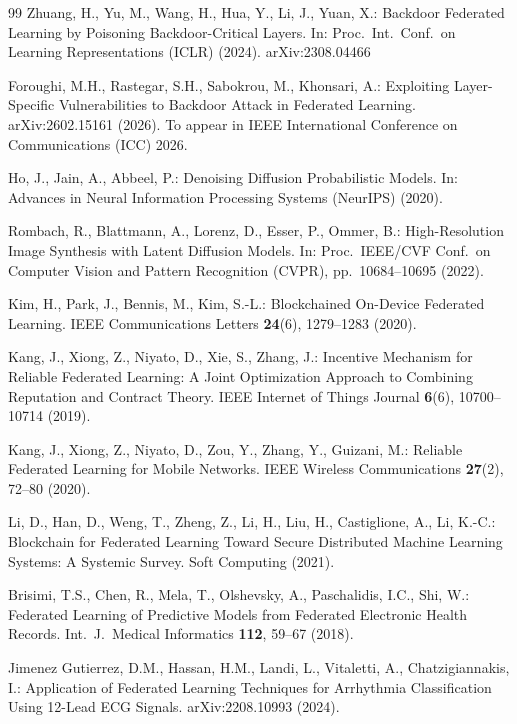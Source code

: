 \documentclass[runningheads]{llncs}
\begin{document}
\begin{thebibliography}{99}
Zhuang, H., Yu, M., Wang, H., Hua, Y., Li, J., Yuan, X.:
Backdoor Federated Learning by Poisoning Backdoor-Critical
Layers. In: Proc.\ Int.\ Conf.\ on Learning Representations
(ICLR) (2024). arXiv:2308.04466

Foroughi, M.H., Rastegar, S.H., Sabokrou, M., Khonsari, A.:
Exploiting Layer-Specific Vulnerabilities to Backdoor Attack in
Federated Learning. arXiv:2602.15161 (2026). To appear in
IEEE International Conference on Communications (ICC) 2026.

Ho, J., Jain, A., Abbeel, P.: Denoising Diffusion Probabilistic
Models. In: Advances in Neural Information Processing Systems
(NeurIPS) (2020).

Rombach, R., Blattmann, A., Lorenz, D., Esser, P., Ommer, B.:
High-Resolution Image Synthesis with Latent Diffusion Models.
In: Proc.\ IEEE/CVF Conf.\ on Computer Vision and Pattern
Recognition (CVPR), pp.~10684--10695 (2022).

Kim, H., Park, J., Bennis, M., Kim, S.-L.: Blockchained
On-Device Federated Learning. IEEE Communications Letters
\textbf{24}(6), 1279--1283 (2020). 

Kang, J., Xiong, Z., Niyato, D., Xie, S., Zhang, J.: Incentive
Mechanism for Reliable Federated Learning: A Joint Optimization
Approach to Combining Reputation and Contract Theory. IEEE
Internet of Things Journal \textbf{6}(6), 10700--10714 (2019).

Kang, J., Xiong, Z., Niyato, D., Zou, Y., Zhang, Y., Guizani, M.:
Reliable Federated Learning for Mobile Networks. IEEE Wireless
Communications \textbf{27}(2), 72--80 (2020).

Li, D., Han, D., Weng, T., Zheng, Z., Li, H., Liu, H., Castiglione,
A., Li, K.-C.: Blockchain for Federated Learning Toward Secure
Distributed Machine Learning Systems: A Systemic Survey. Soft
Computing (2021). 

Brisimi, T.S., Chen, R., Mela, T., Olshevsky, A., Paschalidis,
I.C., Shi, W.: Federated Learning of Predictive Models from
Federated Electronic Health Records. Int.\ J.\ Medical
Informatics \textbf{112}, 59--67 (2018).

Jimenez Gutierrez, D.M., Hassan, H.M., Landi, L., Vitaletti, A.,
Chatzigiannakis, I.: Application of Federated Learning
Techniques for Arrhythmia Classification Using 12-Lead ECG
Signals. arXiv:2208.10993 (2024).

\end{thebibliography}
\end{document}
